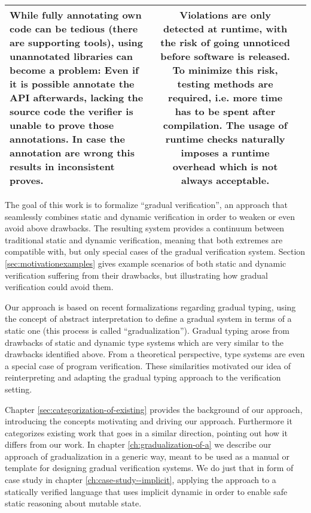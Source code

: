 \begin{tabular}{l | c | c}
\begin{minipage}{170pt}
        While fully annotating own code can be tedious (there are supporting tools), using unannotated libraries can become a problem:
        Even if it is possible annotate the API afterwards, lacking the source code the verifier is unable to prove those annotations.
        In case the annotation are wrong this results in inconsistent proves.
        \vspace{5pt}
    \end{minipage}
    &
    \begin{minipage}{170pt}
        \vspace{3pt}
        Violations are only detected at runtime, with the risk of going unnoticed before software is released.
        To minimize this risk, testing methods are required, i.e. more time has to be spent after compilation.
        The usage of runtime checks naturally imposes a runtime overhead which is not always acceptable.
        \vspace{5pt}
    \end{minipage}\\\hline
\end{tabular}

The goal of this work is to formalize “gradual verification”, an approach that seamlessly combines static and dynamic verification in order to weaken or even avoid above drawbacks.
The resulting system provides a continuum between traditional static and dynamic verification, meaning that both extremes are compatible with, but only special cases of the gradual verification system.
Section \ref{sec:motivationexamples} gives example scenarios of both static and dynamic verification suffering from their drawbacks, but illustrating how gradual verification could avoid them.

Our approach is based on recent formalizations regarding gradual typing, using the concept of abstract interpretation to define a gradual system in terms of a static one (this process is called “gradualization”).
Gradual typing arose from drawbacks of static and dynamic type systems which are very similar to the drawbacks identified above.
From a theoretical perspective, type systems are even a special case of program verification. 
These similarities motivated our idea of reinterpreting and adapting the gradual typing approach to the verification setting.

Chapter \ref{sec:categorization-of-existing} provides the background of our approach, introducing the concepts motivating and driving our approach.
Furthermore it categorizes existing work that goes in a similar direction, pointing out how it differs from our work.
In chapter \ref{ch:gradualization-of-a} we describe our approach of gradualization in a generic way, meant to be used as a manual or template for designing gradual verification systems.
We do just that in form of case study in chapter \ref{ch:case-study--implicit}, applying the approach to a statically verified language that uses implicit dynamic in order to enable safe static reasoning about mutable state.

